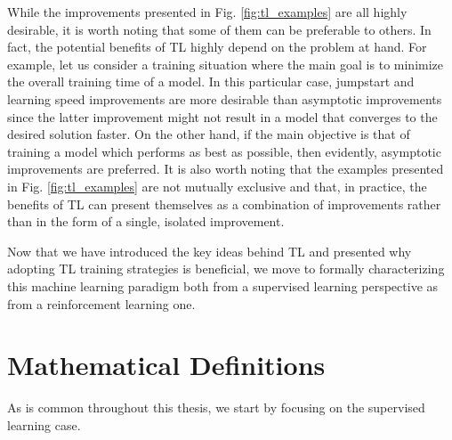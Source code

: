 While the improvements presented in Fig. \ref{fig:tl_examples} are all highly desirable, it is worth noting that some of them can be preferable to others. In fact, the potential benefits of TL highly depend on the problem at hand. For example, let us consider a training situation where the main goal is to minimize the overall training time of a model. In this particular case, jumpstart and learning speed improvements are more desirable than asymptotic improvements since the latter improvement might not result in a model that converges to the desired solution faster. On the other hand, if the main objective is that of training a model which performs as best as possible, then evidently, asymptotic improvements are preferred. It is also worth noting that the examples presented in Fig. \ref{fig:tl_examples} are not mutually exclusive and that, in practice, the benefits of TL can present themselves as a combination of improvements rather than in the form of a single, isolated improvement. 

Now that we have introduced the key ideas behind TL and presented why adopting TL training strategies is beneficial, we move to formally characterizing this machine learning paradigm both from a supervised learning perspective as from a reinforcement learning one.

\section{Mathematical Definitions}
\label{sec:definitions}

As is common throughout this thesis, we start by focusing on the supervised learning case.

